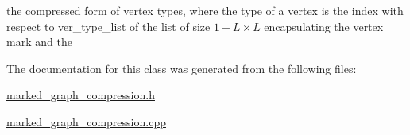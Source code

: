 the compressed form of vertex types, where the type of a vertex is the index with respect to ver\+\_\+type\+\_\+list of the list of size $1 + L \times L$ encapsulating the vertex mark and the 



The documentation for this class was generated from the following files\+:\begin{DoxyCompactItemize}
\item 
\hyperlink{marked__graph__compression_8h}{marked\+\_\+graph\+\_\+compression.\+h}\item 
\hyperlink{marked__graph__compression_8cpp}{marked\+\_\+graph\+\_\+compression.\+cpp}\end{DoxyCompactItemize}
